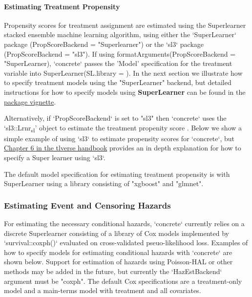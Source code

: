 \documentclass{report}
\newcommand{\1}{\ensuremath{\mathbf{1}}}
\begin{document}
\paragraph{Estimating Treatment Propensity}
Propensity scores for treatment assignment are estimated using the Superlearner stacked ensemble machine learning algorithm, using either the `SuperLearner` package (PropScoreBackend = "Superlearner") or the `sl3` package (PropScoreBackend = "sl3").  If using formatArguments(PropScoreBackend = "SuperLearner), `concrete`  passes the 'Model' specification for the treatment variable into SuperLearner(SL.library = ). In the next section we illustrate how to specify treatment models using the "SuperLearner" backend, but detailed instructions for how to specify models using \textbf{SuperLearner} can be found in the \href{https://cran.r-project.org/web/packages/SuperLearner/vignettes/Guide-to-SuperLearner.html}{package vignette}.

Alternatively, if `PropScoreBackend` is set to "sl3" then `concrete` uses the `sl3::Lrnr\textsubscript{sl}' object to estimate the treatment propenity score . Below we show a simple example of using `sl3` to estimate propensity scores for `concrete`, but  \href{https://tlverse.org/tlverse-handbook/sl3.html}{Chapter 6 in the tlverse handbook} provides an in depth explanation for how to specify a Super learner using `sl3`.

The default model specification for estimating treatment propensity is with SuperLearner using a library consisting of "xgboost" and "glmnet".

\subsubsection{Estimating Event and Censoring Hazards}

For estimating the necessary conditional hazards, `concrete` currently relies on a discrete Superlearner consisting of a library of Cox models implemented by `survival::coxph()` evaluated on cross-validated pseuo-likelihood loss. Examples of how to specify models for estimating conditional hazards with `concrete` are shown below. Support for estimation of hazards using Poisson-HAL or other methods may be added in the future, but currently the `HazEstBackend` argument must be "coxph". The default Cox specifications are a treatment-only model and a main-terms model with treatment and all covariates.  
\end{document}
